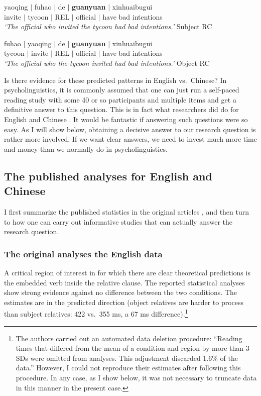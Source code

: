 \documentclass{ar-1col}\usepackage[]{graphicx}\usepackage[]{color}
\begin{document}
\begin{exe} 
\ex   \label{chineseexample}
\begin{xlist}
\item \label{SRCN}  
\gll  yaoqing $\mid$ fuhao $\mid$ de $\mid$ \textbf{guanyuan} $\mid$ xinhuaibugui\\
invite $\mid$ tycoon $\mid$ REL $\mid$ official $\mid$ have bad intentions\\
\textit{`The official who invited the tycoon had bad intentions.'} Subject RC 
\item \label{ORCN}  
\gll  fuhao $\mid$ yaoqing   $\mid$ de $\mid$ \textbf{guanyuan} $\mid$ xinhuaibugui\\
tycoon $\mid$  invite $\mid$ REL $\mid$ official $\mid$ have bad intentions\\
\textit{`The official who the tycoon invited had bad intentions.'} Object RC
\end{xlist}
\end{exe}

Is there evidence for these predicted patterns in English vs.\ Chinese? In psycholinguistics, it is commonly assumed that one can just run a self-paced reading study with some 40 or so participants and multiple items and get a definitive answer to this question. This is in fact what researchers did do for English \citep{grodner} and Chinese \citep{hsiao03,gibsonwu}. It would be fantastic if answering such questions were so easy. As I will show below, obtaining a decisive answer to our research question is rather more involved. If we want clear answers, we need to invest much more time and money than we normally do in psycholinguistics.

\subsection{The published analyses for English and Chinese}

I first summarize the published statistics in the original articles \citep{grodner,gibsonwu}, and then turn to how one can carry out informative studies that can actually answer the research question.

\subsubsection{The original analyses the English data}

A critical region of interest in \citet{grodner} for which there are clear theoretical predictions is the embedded verb inside the relative clause. The reported statistical analyses show strong evidence against no difference between the two conditions. The estimates are  in the predicted direction (object relatives are harder to process than subject relatives: 422 vs.\ 355 ms, a 67 ms difference).\footnote{The authors carried out an automated data deletion procedure: ``Reading times that differed from the mean of a condition and region by more than 3 SDs were omitted from analyses. This adjustment discarded 1.6\% of the data.'' However, I could not reproduce their estimates after following this procedure. In any case, as I show below, it was not necessary to truncate data in this manner in the present case.}
\end{document}
